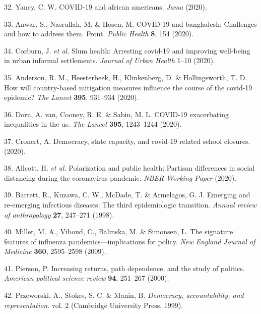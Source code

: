 \documentclass[]{article}
\begin{document}
\leavevmode\hypertarget{ref-yancy2020covid}{}%
32. Yancy, C. W. COVID-19 and african americans. \emph{Jama} (2020).

\leavevmode\hypertarget{ref-anwar2020covid}{}%
33. Anwar, S., Nasrullah, M. \& Hosen, M. COVID-19 and bangladesh: Challenges and how to address them. Front. \emph{Public Health} \textbf{8}, 154 (2020).

\leavevmode\hypertarget{ref-corburn2020slum}{}%
34. Corburn, J. \emph{et al.} Slum health: Arresting covid-19 and improving well-being in urban informal settlements. \emph{Journal of Urban Health} 1--10 (2020).

\leavevmode\hypertarget{ref-anderson2020will}{}%
35. Anderson, R. M., Heesterbeek, H., Klinkenberg, D. \& Hollingsworth, T. D. How will country-based mitigation measures influence the course of the covid-19 epidemic? \emph{The Lancet} \textbf{395}, 931--934 (2020).

\leavevmode\hypertarget{ref-van2020covid}{}%
36. Dorn, A. van, Cooney, R. E. \& Sabin, M. L. COVID-19 exacerbating inequalities in the us. \emph{The Lancet} \textbf{395}, 1243--1244 (2020).

\leavevmode\hypertarget{ref-cronert2020democracy}{}%
37. Cronert, A. Democracy, state capacity, and covid-19 related school closures. (2020).

\leavevmode\hypertarget{ref-allcott2020polarization}{}%
38. Allcott, H. \emph{et al.} Polarization and public health: Partisan differences in social distancing during the coronavirus pandemic. \emph{NBER Working Paper} (2020).

\leavevmode\hypertarget{ref-barrett1998emerging}{}%
39. Barrett, R., Kuzawa, C. W., McDade, T. \& Armelagos, G. J. Emerging and re-emerging infectious diseases: The third epidemiologic transition. \emph{Annual review of anthropology} \textbf{27}, 247--271 (1998).

\leavevmode\hypertarget{ref-miller2009signature}{}%
40. Miller, M. A., Viboud, C., Balinska, M. \& Simonsen, L. The signature features of influenza pandemics---implications for policy. \emph{New England Journal of Medicine} \textbf{360}, 2595--2598 (2009).

\leavevmode\hypertarget{ref-pierson2000increasing}{}%
41. Pierson, P. Increasing returns, path dependence, and the study of politics. \emph{American political science review} \textbf{94}, 251--267 (2000).

\leavevmode\hypertarget{ref-przeworski1999democracy}{}%
42. Przeworski, A., Stokes, S. C. \& Manin, B. \emph{Democracy, accountability, and representation}. vol. 2 (Cambridge University Press, 1999).
\end{document}
